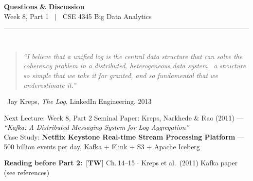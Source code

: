 \documentclass[aspectratio=169,10pt]{beamer}
\begin{document}
\begin{frame}[c]
  \begin{center}
    {\Large\bfseries Questions \& Discussion}\\[10pt]
    {\large Week 8, Part 1 $\;\mid\;$ CSE 4345 Big Data Analytics}\\[8pt]
    \textcolor{PUGray}{\rule{7cm}{0.5pt}}\\[10pt]
    \begin{quote}
      \itshape ``I believe that a unified log is the central data structure that can solve the coherency problem in a distributed, heterogeneous data system \textemdash\ a structure so simple that we take it for granted, and so fundamental that we underestimate it.''
    \end{quote}
    \hfill\textemdash\ Jay Kreps, \textit{The Log}, LinkedIn Engineering, 2013
    \vspace{12pt}
    \begin{block}{\centering Next Lecture: Week 8, Part 2}
      \centering
      Seminal Paper: Kreps, Narkhede \& Rao (2011) --- \textit{``Kafka: A Distributed Messaging System for Log Aggregation''}\\[4pt]
      \small Case Study: \textbf{Netflix Keystone Real-time Stream Processing Platform} ---
      500 billion events per day, Kafka + Flink + S3 + Apache Iceberg
    \end{block}
    \vspace{6pt}
    \textbf{Reading before Part 2:}\ \textbf{[TW]} Ch.\,14--15 $\cdot$ Kreps et al.\ (2011) Kafka paper (see references)
  \end{center}
\end{frame}

\end{document}
